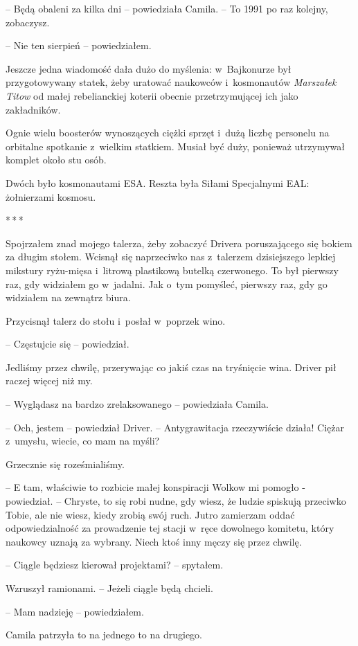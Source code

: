 \documentclass[oneside,polish,12pt,sfheadings]{mwbk}
\newcommand{\threeast}{\bigskip\par\centerline{*\,*\,*}\medskip\par}%
\begin{document}
-- Będą obaleni za kilka dni -- powiedziała Camila. -- To 1991 po raz
kolejny, zobaczysz.

-- Nie ten sierpień -- powiedziałem.

Jeszcze jedna wiadomość dała dużo do myślenia: w~Bajkonurze był
przygotowywany statek, żeby uratować naukowców i~kosmonautów
\emph{Marszałek Titow} od małej rebelianckiej koterii obecnie
przetrzymującej ich jako zakładników.

Ognie wielu boosterów wynoszących ciężki sprzęt i~dużą liczbę personelu
na orbitalne spotkanie z~wielkim statkiem. Musiał być duży, ponieważ
utrzymywał komplet około stu osób.

Dwóch było kosmonautami ESA. Reszta była Siłami Specjalnymi EAL:
żołnierzami kosmosu.

\threeast

Spojrzałem znad mojego talerza, żeby zobaczyć Drivera poruszającego się
bokiem za długim stołem. Wcisnął się naprzeciwko nas z~talerzem
dzisiejszego lepkiej mikstury ryżu-mięsa i~litrową plastikową butelką
czerwonego. To był pierwszy raz, gdy widziałem go w~jadalni. Jak o~tym
pomyśleć, pierwszy raz, gdy go widziałem na zewnątrz biura.

Przycisnął talerz do stołu i~posłał w~poprzek wino.

-- Częstujcie się -- powiedział.

Jedliśmy przez chwilę, przerywając co jakiś czas na tryśnięcie wina.
Driver pił raczej więcej niż my.

-- Wyglądasz na bardzo zrelaksowanego -- powiedziała Camila.

-- Och, jestem -- powiedział Driver. -- Antygrawitacja rzeczywiście działa!
Ciężar z~umysłu, wiecie, co mam na myśli?

Grzecznie się roześmialiśmy.

-- E tam, właściwie to rozbicie małej konspiracji Wolkow mi pomogło -
powiedział. -- Chryste, to się robi nudne, gdy wiesz, że ludzie spiskują
przeciwko Tobie, ale nie wiesz, kiedy zrobią swój ruch. Jutro zamierzam
oddać odpowiedzialność za prowadzenie tej stacji w~ręce dowolnego
komitetu, który naukowcy uznają za wybrany. Niech ktoś inny męczy się
przez chwilę.

-- Ciągle będziesz kierował projektami? -- spytałem.

Wzruszył ramionami. -- Jeżeli ciągle będą chcieli.

-- Mam nadzieję -- powiedziałem.

Camila patrzyła to na jednego to na drugiego.
\end{document}
